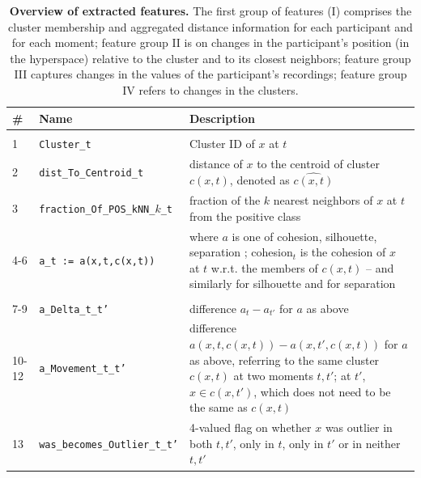 \documentclass[
  oneside]{book}
\begin{document}
\begin{table}

\caption{\label{tab:07-tab-evo-features}\textbf{Overview of extracted features.} The first group of features (I) comprises the cluster membership and aggregated distance information for each participant and for each moment; feature group II is on changes in the participant's position (in the hyperspace) relative to the cluster and to its closest neighbors; feature group III captures changes in the values of the participant's recordings; feature group IV refers to changes in the clusters.}
\centering
\begin{tabular}[t]{llp{8cm}}
\toprule
\textbf{\#} & \textbf{Name} & \textbf{Description}\\
\midrule
\addlinespace[0.3em]
\multicolumn{3}{l}{\textbf{I: Features for participant $x$ at each moment}}\\
\hspace{1em}1 & \texttt{Cluster\_t} & Cluster ID of $x$ at $t$\\
\hspace{1em}2 & \texttt{dist\_To\_Centroid\_t} & distance of $x$ to the centroid of cluster $c(x,t)$, denoted as $\widehat{c(x,t)}$\\
\hspace{1em}3 & \texttt{fraction\_Of\_POS\_kNN\_}$k$\texttt{\_t} & fraction of the $k$ nearest neighbors of $x$ at $t$ from the positive class\\
\hspace{1em}4-6 & \texttt{a\_t := a(x,t,c(x,t))} & where $a$ is one of {cohesion, silhouette, separation} \cite{TanDMbook}; cohesion$_t$ is the cohesion of $x$ at $t$ w.r.t. the members of $c(x,t)$ -- and similarly for silhouette and for separation\\
\addlinespace[0.3em]
\multicolumn{3}{l}{\textbf{II: Evolution features linked to each participant $x$}}\\
\hspace{1em}7-9 & \texttt{a\_Delta\_t\_t'} & difference $a_{t} - a_{t'}$ for $a$ as above\\
\hspace{1em}10-12 & \texttt{a\_Movement\_t\_t'} & difference $a(x,t,c(x,t)) - a(x,t',c(x,t))$ for $a$ as above, referring to the same cluster $c(x,t)$ at two moments $t,t'$; at $t'$, $x\in{}c(x,t')$, which does not need to be the same as $c(x,t)$\\
\hspace{1em}13 & \texttt{was\_becomes\_Outlier\_t\_t'} & 4-valued flag on whether $x$ was outlier in both $t, t'$, only in $t$, only in $t'$ or in neither$t, t'$\\

\end{tabular}
\end{table}
\end{document}
